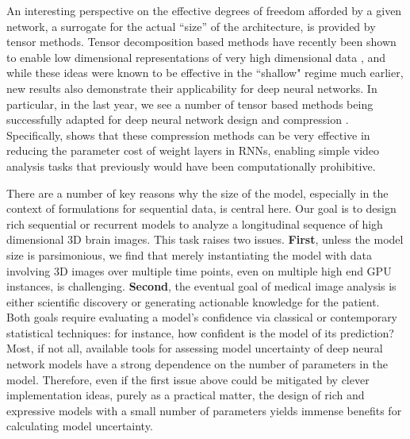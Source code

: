 An interesting perspective on the effective degrees of freedom afforded 
by a given network, a surrogate for the actual ``size'' of the architecture, 
is provided by tensor methods.
Tensor decomposition based methods have recently been shown to enable low dimensional representations of very high dimensional data \citep{hwangCvpr18}, 
and while these ideas were known to be effective in the ``shallow" regime much earlier, new results also demonstrate their applicability for deep neural 
networks. 
In particular, in the last year, we see a number of tensor based methods being successfully adapted for deep neural network design and compression \citep{cohen2016expressive,zhang2017tucker,yu2017compressing,xiong2019antnets}.
Specifically, \cite{pmlr-v70-yang17e} shows that these compression methods can be very effective in reducing the parameter cost of weight layers in RNNs, enabling simple video analysis tasks that previously would have been computationally prohibitive.

There are a number of key reasons why the size of the model, especially in the context of formulations for sequential data, is central here. Our goal is to design rich sequential or recurrent models to analyze a longitudinal sequence of high dimensional 3D brain images. 
This task raises two issues. \textbf{First}, 
unless the model size is parsimonious, we find that merely instantiating the 
model with data involving 3D images over multiple time points, even on multiple high end GPU instances, is challenging.
\textbf{Second}, 
the eventual goal of medical image analysis is either scientific discovery or generating 
actionable knowledge for the patient. 
Both goals require evaluating a model's confidence via 
classical or contemporary statistical techniques: for instance, how confident is the model of its prediction?  
Most, if not all, available tools for assessing 
model uncertainty of deep neural network models 
have a strong dependence on the number of parameters in 
the model. Therefore, even if the first issue above could be mitigated by clever implementation ideas, purely as a practical 
matter, the design of rich and expressive models with a small number of parameters yields immense benefits for calculating model uncertainty.


